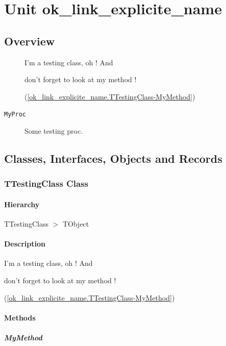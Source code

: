 \documentclass{report}
\begin{document}
\chapter{Unit ok{\_}link{\_}explicite{\_}name}
\section{Overview}
\begin{description}
\item[\texttt{\begin{ttfamily}TTestingClass\end{ttfamily} Class}]I'm a testing class, oh ! And \begin{ttfamily}don't forget to look at my method !\end{ttfamily}(\ref{ok_link_explicite_name.TTestingClass-MyMethod})
\end{description}
\begin{description}
\item[\texttt{MyProc}]Some testing proc.
\end{description}
\section{Classes, Interfaces, Objects and Records}
\subsection*{TTestingClass Class}
\subsubsection*{\large{\textbf{Hierarchy}}\normalsize\hspace{1ex}\hfill}
TTestingClass {$>$} TObject
\subsubsection*{\large{\textbf{Description}}\normalsize\hspace{1ex}\hfill}
I'm a testing class, oh ! And \begin{ttfamily}don't forget to look at my method !\end{ttfamily}(\ref{ok_link_explicite_name.TTestingClass-MyMethod})\subsubsection*{\large{\textbf{Methods}}\normalsize\hspace{1ex}\hfill}
\paragraph*{MyMethod}\hspace*{\fill}
\end{document}
